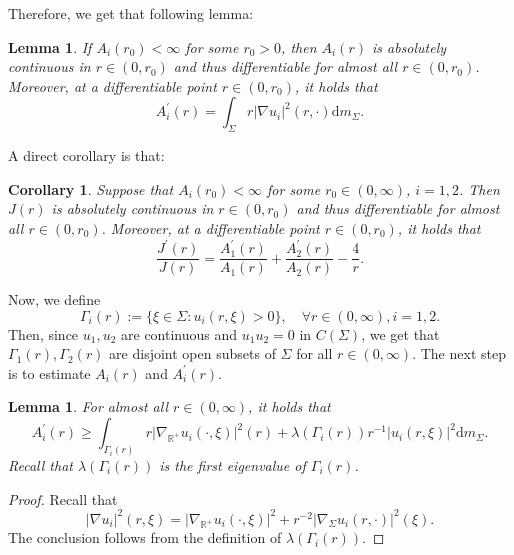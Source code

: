 \documentclass{article}
\newtheorem{corollary}[theorem]{Corollary}
\newtheorem{lemma}[theorem]{Lemma}
\theoremstyle{remark}
\numberwithin{equation}{section}
\theoremstyle{definition}
\begin{document}
    Therefore, we get that following lemma:
    \begin{lemma}\label{lemma_1_proof_of_main_theorem}
        If $A_{i}(r_{0}) < \infty$ for some $r_{0} >0$, then $A_{i}(r)$ is absolutely continuous in $r \in (0,r_{0})$ and thus differentiable for almost all $r \in (0,r_{0})$. Moreover, at a differentiable point $r \in (0,r_{0})$, it holds that
     	\begin{equation}
     		A_{i}^{\prime}(r) = \int_{\Sigma} r \lvert \nabla u_{i} \rvert^{2}(r,\cdot) \mathrm{d}m_{\Sigma}.
     	\end{equation}
    \end{lemma}
    A direct corollary is that:
    \begin{corollary}\label{corollary_1_proof_of_main_theorem}
     	Suppose that $A_{i}(r_{0}) < \infty$ for some $r_{0} \in (0,\infty)$, $i=1,2$. Then $J(r)$ is absolutely continuous in $r \in (0,r_{0})$ and thus differentiable for almost all $r \in (0,r_{0})$. Moreover, at a differentiable point $r \in (0,r_{0})$, it holds that
     	\begin{equation}
     		\frac{J^{\prime}(r)}{J(r)} = \frac{A_{1}^{\prime}(r)}{A_{1}(r)} + \frac{A_{2}^{\prime}(r)}{A_{2}(r)} - \frac{4}{r}.
     	\end{equation}
    \end{corollary}
    Now, we define
    \begin{equation}
    	\Gamma_{i}(r) := \{\xi \in \Sigma : u_{i}(r,\xi) > 0\},\quad \forall r \in (0,\infty),i=1,2.
    \end{equation}
    Then, since $u_{1},u_{2}$ are continuous and $u_{1}u_{2}=0$ in $C(\Sigma)$, we get that $\Gamma_{1}(r),\Gamma_{2}(r)$ are disjoint open subsets of $\Sigma$ for all $r \in (0,\infty)$. The next step is to estimate $A_{i}(r)$ and $A_{i}^{\prime}(r)$.
    \begin{lemma}\label{lemma_2_proof_of_main_theorem}
    	For almost all $r \in (0,\infty)$, it holds that
    	\begin{equation}
    		A_{i}^{\prime}(r) \ge \int_{\Gamma_{i}(r)} r\lvert \nabla_{\mathbb{R}^{+}} u_{i}(\cdot,\xi) \rvert^{2} (r) + \lambda(\Gamma_{i}(r))r^{-1} \lvert u_{i}(r,\xi) \rvert^{2} \mathrm{d}m_{\Sigma}.
    	\end{equation}
    	Recall that $\lambda(\Gamma_{i}(r))$ is the first eigenvalue of $\Gamma_{i}(r)$.
    \end{lemma}
    \begin{proof}
    	Recall that
    	\begin{equation}
    		\lvert \nabla u_{i} \rvert^{2}(r,\xi) = \lvert \nabla_{\mathbb{R}^{+}} u_{i} (\cdot,\xi)\rvert^{2} + r^{-2} \lvert \nabla_{\Sigma} u_{i}(r,\cdot) \rvert^{2}(\xi).
    	\end{equation}
    	The conclusion follows from the definition of $\lambda(\Gamma_{i}(r))$.
    \end{proof}
\end{document}

